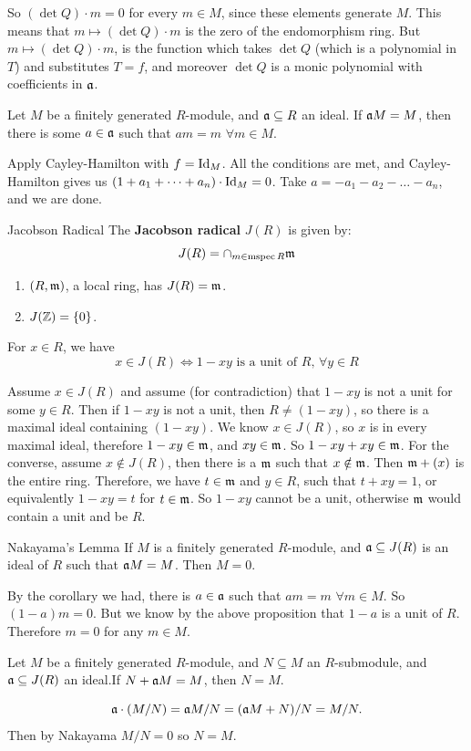 \documentclass{article}
\begin{document}
So $(\det Q) \cdot m = 0$ for every $m \in M$, since these elements generate $M$. This means that $m \mapsto (\det Q) \cdot m$ is the zero of the endomorphism ring. But $m \mapsto (\det Q) \cdot m$, is the function which takes $\det Q$ (which is a polynomial in $T$) and substitutes $T=f$, and moreover $\det Q$ is a monic polynomial with coefficients in $\mathfrak{a}$. \endproof
\begin{corr}{}
    Let $M$ be a finitely generated $R$-module, and $\mathfrak{a} \subseteq R$ an ideal.\gap 
    If $\mathfrak{a} M = M$, then there is some $a \in \mathfrak{a}$ such that $am=m$ $\forall m \in M$.
\end{corr}
\proof Apply Cayley-Hamilton with $f=\operatorname{Id}_{M}$. All the conditions are met, and Cayley-Hamilton gives us $(1+a_{1}+ \dots + a_{n})\cdot \operatorname{Id}_{M} = 0$. Take $a = -a_{1}-a_{2}-\dots -a_{n}$, and we are done.
\endproof

\begin{fancydefine}{Jacobson Radical}
    The \textbf{Jacobson radical} $J(R)$ is given by: \[ J(R) = \cap_{m \in \operatorname{mspec} R} \mathfrak{m}\]
\end{fancydefine}
\begin{ex}
    \hspace{0.1cm}
    \begin{enumerate}
        \item $(R, \mathfrak{m})$, a local ring, has $J(R)=\mathfrak{m}$.
        \item $J(\mathbb{Z})=\{0\}$.
    \end{enumerate}
\end{ex}
\begin{fancyprop}{}
    For $x \in R$, we have \[ x \in J(R) \Leftrightarrow 1-xy \text{ is a unit of $R$, } \forall y \in R\]
\end{fancyprop}
\proof Assume $x \in J(R)$ and assume (for contradiction) that $1-xy$ is not a unit for some $y \in R$. Then if $1-xy$ is not a unit, then $R \neq (1-xy)$, so there is a maximal ideal containing $(1-xy)$. We know $x \in J(R)$, so $x$ is in every maximal ideal, therefore $1-xy \in \mathfrak{m}$, and $xy \in \mathfrak{m}$. So $1-xy +xy \in \mathfrak{m}$.\gap 
For the converse, assume $x \notin J(R)$, then there is a $\mathfrak{m}$ such that $x \notin \mathfrak{m}$. Then $\mathfrak{m} + (x)$ is the entire ring. Therefore, we have $t \in \mathfrak{m}$ and $y \in R$, such that $t+xy=1$, or equivalently $1-xy = t$ for $t \in \mathfrak{m}$. So $1-xy$ cannot be a unit, otherwise $\mathfrak{m}$ would contain a unit and be $R$.
\endproof
\begin{fancylem}{Nakayama's Lemma}
    If $M$ is a finitely generated $R$-module, and $\mathfrak{a} \subseteq J(R)$ is an ideal of $R$ such that $\mathfrak{a} M = M$. Then $M = 0$.
\end{fancylem}
\proof By the corollary we had, there is $a \in \mathfrak{a}$ such that $am = m$ $\forall m \in M$. So $(1-a)m = 0$. But we know by the above proposition that $1-a$ is a unit of $R$. Therefore $m=0$ for any $m \in M$. \endproof
\begin{corr}{}
    Let $M$ be a finitely generated $R$-module, and $N \subseteq M$ an $R$-submodule, and $\mathfrak{a} \subseteq J(R)$ an ideal.\gap If $N + \mathfrak{a} M = M$, then $N=M$.
\end{corr}
\proof \[\mathfrak{a} \cdot (M/N) = \mathfrak{a} M/N = (\mathfrak{a} M + N)/N = M/N.\] Then by Nakayama $M/N = 0$ so $N=M$.
\endproof
\end{document}
